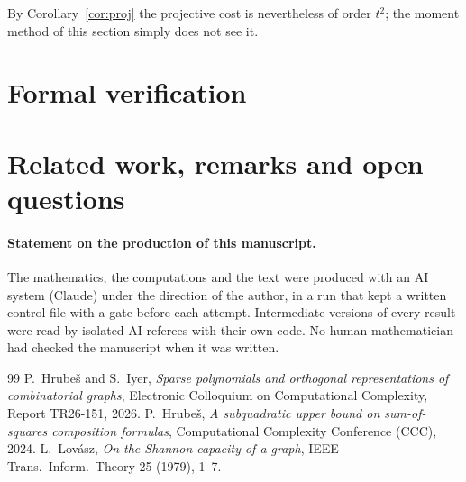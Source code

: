 \documentclass[11pt]{article}
\theoremstyle{remark}
\begin{document}
By Corollary~\ref{cor:proj} the projective cost is nevertheless of order $t^2$; the moment method of this
section simply does not see it.

\section{Formal verification}\label{sec:lean}


\section{Related work, remarks and open questions}\label{sec:lit}


\paragraph{Statement on the production of this manuscript.}
The mathematics, the computations and the text were produced with an AI system (Claude) under the direction
of the author, in a run that kept a written control file with a gate before each attempt. Intermediate
versions of every result were read by isolated AI referees with their own code. No human mathematician had
checked the manuscript when it was written.

\begin{thebibliography}{99}
 P.~Hrube\v{s} and S.~Iyer, \emph{Sparse polynomials and orthogonal representations of
combinatorial graphs}, Electronic Colloquium on Computational Complexity, Report TR26-151, 2026.
 P.~Hrube\v{s}, \emph{A subquadratic upper bound on sum-of-squares composition formulas},
Computational Complexity Conference (CCC), 2024.
 L.~Lov\'asz, \emph{On the Shannon capacity of a graph}, IEEE Trans.\ Inform.\ Theory 25 (1979),
1--7.

\end{thebibliography}
\end{document}
